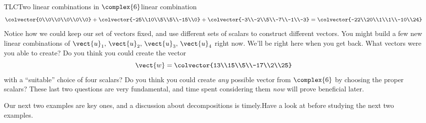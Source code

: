 \begin{example}{TLC}{Two linear combinations in $\complex{6}$}{linear combination}
\begin{align*}
\colvector{0\\0\\0\\0\\0\\0}+
\colvector{-25\\10\\5\\5\\-15\\0}+
\colvector{-3\\-2\\5\\-7\\-1\\-3}
%
=\colvector{-22\\20\\1\\1\\-10\\24}
\end{align*}
%
Notice how we could keep our set of vectors fixed, and use different sets of scalars to construct different vectors.  You might build a few new linear combinations of $\vect{u}_1,\,\vect{u}_2,\,\vect{u}_3,\,\vect{u}_4$ right now.  We'll be right here when you get back.  What vectors were you able to create?  Do you think you could create the vector
%
\begin{equation*}
\vect{w}=\colvector{13\\15\\5\\-17\\2\\25}
\end{equation*}
%
with a ``suitable'' choice of four scalars?  Do you think you could create {\em any} possible vector from $\complex{6}$ by choosing the proper scalars?  These last two questions are very fundamental, and time spent considering them {\em now} will prove beneficial later.
\end{example}
%
%
{Our next two examples are key ones, and a discussion about decompositions is timely.}{Have a look at  before studying the next two examples.}
%
